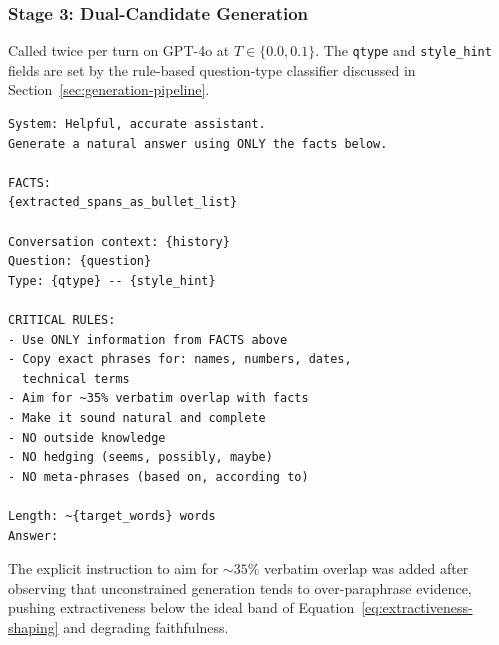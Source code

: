 \subsubsection{Stage 3: Dual-Candidate Generation}
Called twice per turn on GPT-4o at $T \in \{0.0, 0.1\}$. The \texttt{qtype} and \texttt{style\_hint} fields are set by the rule-based question-type classifier discussed in Section~\ref{sec:generation-pipeline}.
\begin{verbatim}
System: Helpful, accurate assistant.
Generate a natural answer using ONLY the facts below.

FACTS:
{extracted_spans_as_bullet_list}

Conversation context: {history}
Question: {question}
Type: {qtype} -- {style_hint}

CRITICAL RULES:
- Use ONLY information from FACTS above
- Copy exact phrases for: names, numbers, dates, 
  technical terms
- Aim for ~35% verbatim overlap with facts
- Make it sound natural and complete
- NO outside knowledge
- NO hedging (seems, possibly, maybe)
- NO meta-phrases (based on, according to)

Length: ~{target_words} words
Answer:
\end{verbatim}
The explicit instruction to aim for $\sim 35\%$ verbatim overlap was added after observing that unconstrained generation tends to over-paraphrase evidence, pushing extractiveness below the ideal band of Equation~\ref{eq:extractiveness-shaping} and degrading faithfulness.

